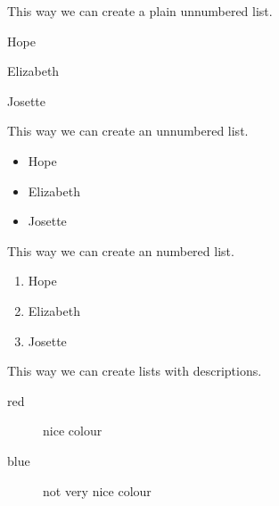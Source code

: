 
This way we can create a plain unnumbered list.

\begin{list}{}{}
	\item Hope
	\item Elizabeth
	\item Josette 
\end{list}

This way we can create an unnumbered list.

\begin{itemize}
	\item Hope
	\item Elizabeth
	\item Josette
\end{itemize}

This way we can create an numbered list.

\begin{enumerate} 
	\item Hope
	\item Elizabeth
	\item Josette
\end{enumerate}

This way we can create lists with descriptions.

\begin{description}
	\item[red] nice colour
	\item[blue] not very nice colour
\end{description}